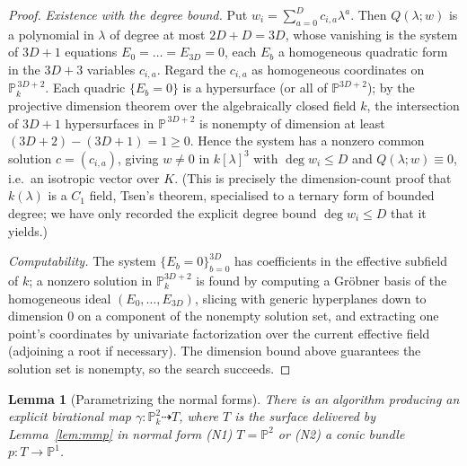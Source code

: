 \documentclass{amsart}
\theoremstyle{plain}
\newtheorem{lemma}{Lemma}
\theoremstyle{definition}
\newcommand{\PP}{\mathbb{P}}
\begin{document}
\begin{proof}
\emph{Existence with the degree bound.}  Put $w_i=\sum_{a=0}^{D}c_{i,a}\lambda^a$.
Then $Q(\lambda;w)$ is a polynomial in $\lambda$ of degree at most $2D+D=3D$,
whose vanishing is the system of $3D+1$ equations $E_0=\dots=E_{3D}=0$, each
$E_b$ a homogeneous quadratic form in the $3D+3$ variables $c_{i,a}$.  Regard the
$c_{i,a}$ as homogeneous coordinates on $\PP^{\,3D+2}_k$.  Each quadric
$\{E_b=0\}$ is a hypersurface (or all of $\PP^{3D+2}$); by the projective
dimension theorem over the algebraically closed field $k$, the intersection of
$3D+1$ hypersurfaces in $\PP^{\,3D+2}$ is nonempty of dimension at least
$(3D+2)-(3D+1)=1\ge 0$.  Hence the system has a nonzero common solution
$c=(c_{i,a})$, giving $w\ne 0$ in $k[\lambda]^3$ with $\deg w_i\le D$ and
$Q(\lambda;w)\equiv 0$, i.e.\ an isotropic vector over $K$.  (This is precisely
the dimension-count proof that $k(\lambda)$ is a $C_1$ field, Tsen's theorem,
specialised to a ternary form of bounded degree; we have only recorded the
explicit degree bound $\deg w_i\le D$ that it yields.)

\emph{Computability.}  The system $\{E_b=0\}_{b=0}^{3D}$ has coefficients in the
effective subfield of $k$; a nonzero solution in $\PP^{3D+2}_k$ is found by
computing a Gr\"obner basis of the homogeneous ideal $(E_0,\dots,E_{3D})$,
slicing with generic hyperplanes down to dimension $0$ on a component of the
nonempty solution set, and extracting one point's coordinates by univariate
factorization over the current effective field (adjoining a root if necessary).
The dimension bound above guarantees the solution set is nonempty, so the search
succeeds.
\end{proof}

\begin{lemma}[Parametrizing the normal forms]\label{lem:param-min}
There is an algorithm producing an explicit birational map
$\gamma\colon\PP^2_k\dashrightarrow T$, where $T$ is the surface delivered by
Lemma~\ref{lem:mmp} in normal form \textup{(N1)} $T=\PP^2$ or \textup{(N2)} a
conic bundle $p\colon T\to\PP^1$.
\end{lemma}
\end{document}
